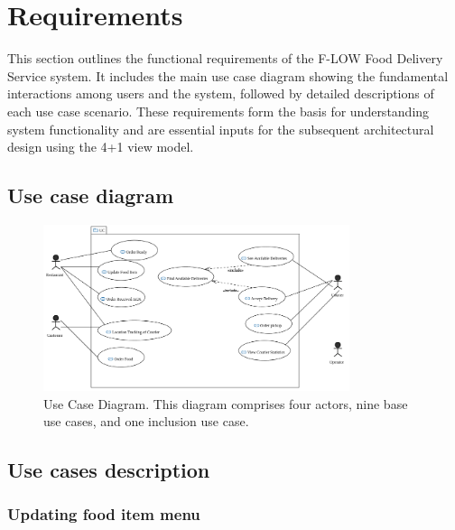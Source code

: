 \section{Requirements}
This section outlines the functional requirements of the F-LOW Food Delivery Service system. It includes the main use case diagram showing the fundamental interactions among users and the system, followed by detailed descriptions of each use case scenario. These requirements form the basis for understanding system functionality and are essential inputs for the subsequent architectural design using the 4+1 view model.

\subsection{Use case diagram}

\begin{figure}[htbp]
  \centering
  \includegraphics[width=0.8\textwidth]{FIGS/UCD-Apr6-v1.png}  %
  \caption{Use Case Diagram. This diagram comprises four actors, nine base use cases, and one inclusion use case.}
  \label{fig:my_label}
\end{figure}

\subsection{Use cases description}

\subsubsection{Updating food item menu}

